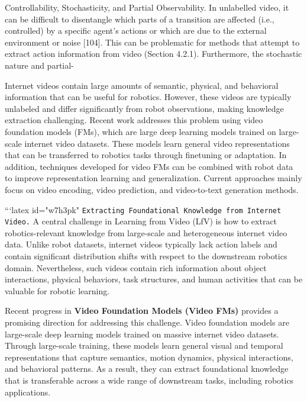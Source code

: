 Controllability, Stochasticity, and Partial Observability. In unlabelled video, it can be difficult to disentangle
which parts of a transition are affected (i.e., controlled) by a specific agent’s actions or which are due to the external
environment or noise [104]. This can be problematic for methods that attempt to extract action information from
video (Section 4.2.1). Furthermore, the stochastic nature and partial-















Internet videos contain large amounts of semantic, physical, and behavioral information that can be useful for robotics. However, these videos are typically unlabeled and differ significantly from robot observations, making knowledge extraction challenging. Recent work addresses this problem using video foundation models (FMs), which are large deep learning models trained on large-scale internet video datasets. These models learn general video representations that can be transferred to robotics tasks through finetuning or adaptation. In addition, techniques developed for video FMs can be combined with robot data to improve representation learning and generalization. Current approaches mainly focus on video encoding, video prediction, and video-to-text generation methods.


```latex id="w7h3pk"
\texttt{Extracting Foundational Knowledge from Internet Video.}
A central challenge in Learning from Video (LfV) is how to extract robotics-relevant knowledge from large-scale and heterogeneous internet video data. Unlike robot datasets, internet videos typically lack action labels and contain significant distribution shifts with respect to the downstream robotics domain. Nevertheless, such videos contain rich information about object interactions, physical behaviors, task structures, and human activities that can be valuable for robotic learning.

Recent progress in \textbf{Video Foundation Models (Video FMs)} provides a promising direction for addressing this challenge. Video foundation models are large-scale deep learning models trained on massive internet video datasets. Through large-scale training, these models learn general visual and temporal representations that capture semantics, motion dynamics, physical interactions, and behavioral patterns. As a result, they can extract foundational knowledge that is transferable across a wide range of downstream tasks, including robotics applications.

